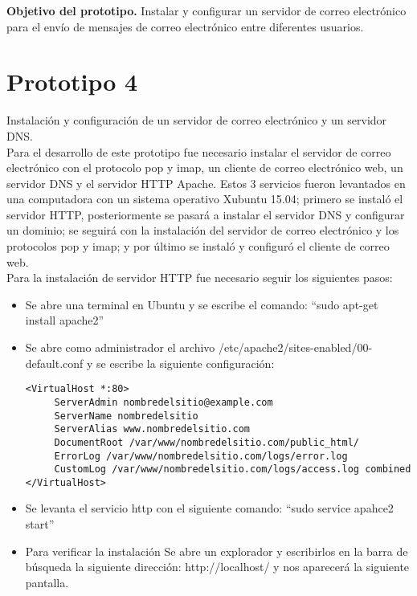 \documentclass[12pt,oneside,onecolumn,openany]{report}
\begin{document}
\textbf{Objetivo del prototipo.}
Instalar y configurar un servidor de correo electrónico para el envío de mensajes de correo electrónico entre diferentes usuarios.\\
\section{Prototipo 4}
Instalación y configuración de un servidor de correo electrónico y un servidor DNS.\\


Para el desarrollo de este prototipo fue necesario instalar el servidor de correo electrónico con el protocolo pop y imap, un cliente de correo electrónico web, un servidor DNS y el servidor HTTP Apache. Estos 3 servicios fueron levantados en una computadora con un sistema operativo Xubuntu 15.04; primero se instaló el servidor HTTP\cite{HTTP}, posteriormente se pasará a instalar el servidor DNS y configurar un dominio\cite{DNS}; se seguirá con la instalación del servidor de correo electrónico y los protocolos pop y imap; y por último se instaló y  configuró el cliente de correo web\cite{web}.\\
Para la instalación de servidor HTTP fue necesario seguir los siguientes pasos:\
\begin{itemize}
 \item Se abre una terminal en Ubuntu y se escribe el comando: “sudo apt-get install apache2”
 \item Se abre como administrador el archivo /etc/apache2/sites-enabled/00-default.conf y se escribe la siguiente configuración:
 \begin{lstlisting}[frame=single]
  <VirtualHost *:80>
     ServerAdmin nombredelsitio@example.com
     ServerName nombredelsitio
     ServerAlias www.nombredelsitio.com
     DocumentRoot /var/www/nombredelsitio.com/public_html/
     ErrorLog /var/www/nombredelsitio.com/logs/error.log
     CustomLog /var/www/nombredelsitio.com/logs/access.log combined
</VirtualHost>
 \end{lstlisting}
 \item Se levanta el servicio http con el siguiente comando: “sudo service apahce2 start”
 \item Para verificar la instalación Se abre un explorador y escribirlos en la barra de búsqueda la siguiente dirección: http://localhost/ y nos aparecerá la siguiente pantalla.
\end{itemize}
\end{document}
